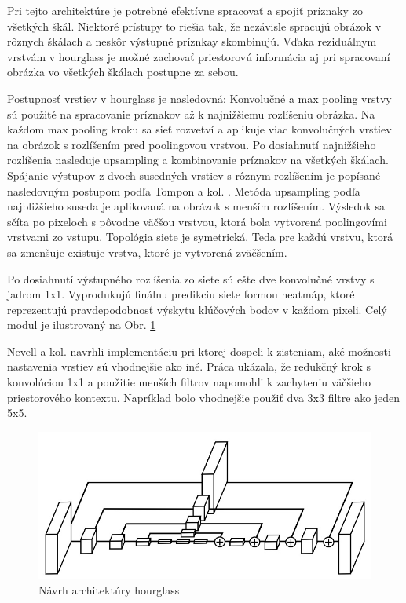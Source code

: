 Pri tejto architektúre je potrebné efektívne spracovať a spojiť príznaky zo všetkých škál. Niektoré prístupy to riešia tak, že nezávisle spracujú obrázok v rôznych škálach a neskôr výstupné príznkay skombinujú. Vďaka reziduálnym vrstvám v hourglass je možné zachovať priestorovú informácia aj pri spracovaní obrázka vo všetkých škálach postupne za sebou.

Postupnosť vrstiev v hourglass je nasledovná: Konvolučné a max pooling vrstvy sú použité na spracovanie príznakov až k najnižšiemu rozlíšeniu obrázka. Na každom max pooling kroku sa sieť rozvetví a aplikuje viac konvolučných vrstiev na obrázok s rozlíšením pred poolingovou vrstvou. Po dosiahnutí najnižšieho rozlíšenia nasleduje upsampling a kombinovanie príznakov na všetkých škálach. Spájanie výstupov z dvoch susedných vrstiev s rôznym rozlíšením je popísané nasledovným postupom podľa Tompon a kol. \cite{DBLP:journals/corr/TompsonJLB14}. Metóda upsampling podľa najbližšieho suseda je aplikovaná na obrázok s menším rozlíšením. Výsledok sa sčíta po pixeloch s pôvodne väčšou vrstvou, ktorá bola vytvorená poolingovími vrstvami zo vstupu. Topológia siete je symetrická. Teda pre každú vrstvu, ktorá sa zmenšuje existuje vrstva, ktoré je vytvorená zväčšením.

Po dosiahnutí výstupného rozlíšenia zo siete sú ešte dve konvolučné vrstvy s jadrom 1x1. Vyprodukujú finálnu predikciu siete formou heatmáp, ktoré reprezentujú pravdepodobnosť výskytu klúčových bodov v každom pixeli. Celý modul je ilustrovaný na Obr. \ref{img:hourglass_architecture}

Nevell a kol. \cite{DBLP:journals/corr/NewellYD16} navrhli implementáciu pri ktorej dospeli k zisteniam, aké možnosti nastavenia vrstiev sú vhodnejšie ako iné. Práca ukázala, že redukčný krok s konvolúciou 1x1 a použitie menších filtrov napomohli k zachyteniu väčšieho priestorového kontextu. Napríklad bolo vhodnejšie použiť dva 3x3 filtre ako jeden 5x5.

\begin{figure}[H]
	\begin{center}
		\includegraphics[scale=0.5]{images/hourglass_architecture.jpg}
		\caption{Návrh architektúry hourglass \cite{DBLP:journals/corr/NewellYD16}}
		\label{img:hourglass_architecture}
	\end{center}
\end{figure}

